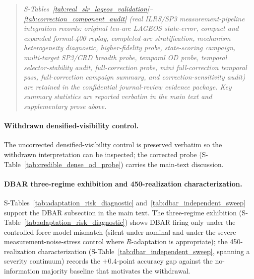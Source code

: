 \documentclass{article}
\begin{document}
\label{tab:real_slr_sp3_temporal_od_campaign}%
\label{tab:real_slr_sp3_temporal_selection_stability}%
\label{tab:real_slr_sp3_corrected}%
\label{tab:real_slr_sp3_temporal_corrected_od_campaign}%
\label{tab:real_slr_sp3_temporal_corrected_od_campaign_summary}%
\label{tab:correction_component_audit}%
\begin{quote}\small
\emph{S-Tables~\ref{tab:real_slr_lageos_validation}--\ref{tab:correction_component_audit} (real ILRS/SP3 measurement-pipeline integration records: original ten-arc LAGEOS state-error, compact and expanded formal-400 replay, completed-arc stratification, mechanism heterogeneity diagnostic, higher-fidelity probe, state-scoring campaign, multi-target SP3/CRD breadth probe, temporal OD probe, temporal selector-stability audit, full-correction probe, mini full-correction temporal pass, full-correction campaign summary, and correction-sensitivity audit) are retained in the confidential journal-review evidence package. Key summary statistics are reported verbatim in the main text and supplementary prose above.}
\end{quote}




\clearpage

\paragraph{Withdrawn densified-visibility control.}
The uncorrected densified-visibility control is preserved verbatim so the withdrawn interpretation can be inspected; the corrected probe (S-Table~\ref{tab:credible_dense_od_probe}) carries the main-text discussion.


\paragraph{DBAR three-regime exhibition and 450-realization characterization.}
S-Tables~\ref{tab:adaptation_risk_diagnostic} and~\ref{tab:dbar_independent_sweep} support the DBAR subsection in the main text. The three-regime exhibition (S-Table~\ref{tab:adaptation_risk_diagnostic}) shows DBAR firing only under the controlled force-model mismatch (silent under nominal and under the severe measurement-noise-stress control where $R$-adaptation is appropriate); the 450-realization characterization (S-Table~\ref{tab:dbar_independent_sweep}, spanning a severity continuum) records the $+0.4$-point accuracy gap against the no-information majority baseline that motivates the withdrawal.


\end{document}
